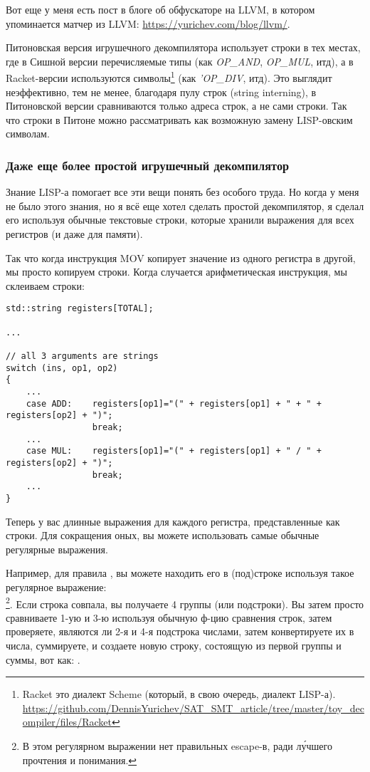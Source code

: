 Вот еще у меня есть пост в блоге об обфускаторе на LLVM, в котором упоминается матчер из LLVM:
\url{https://yurichev.com/blog/llvm/}.

Питоновская версия игрушечного декомпилятора использует строки в тех местах, где в Сишной версии перечисляемые типы
(как \textit{OP\_AND}, \textit{OP\_MUL}, итд),
а в Racket-версии используются символы\footnote{Racket это диалект Scheme (который, в свою очередь, диалект LISP-а).
\url{https://github.com/DennisYurichev/SAT_SMT_article/tree/master/toy_decompiler/files/Racket}} (как \textit{'OP\_DIV}, итд).
Это выглядит неэффективно, тем не менее, благодаря пулу строк (string interning), в Питоновской версии сравниваются
только адреса строк, а не сами строки.
Так что строки в Питоне можно рассматривать как возможную замену LISP-овским символам.

\subsubsection{Даже еще более простой игрушечный декомпилятор}

Знание LISP-а помогает все эти вещи понять без особого труда.
Но когда у меня не было этого знания, но я всё еще хотел сделать простой декомпилятор, я сделал его используя обычные
текстовые строки, которые хранили выражения для всех регистров (и даже для памяти).

Так что когда инструкция MOV копирует значение из одного регистра в другой, мы просто копируем строки.
Когда случается арифметическая инструкция, мы склеиваем строки:

\begin{lstlisting}
std::string registers[TOTAL];

...

// all 3 arguments are strings
switch (ins, op1, op2)
{
    ...
    case ADD:    registers[op1]="(" + registers[op1] + " + " + registers[op2] + ")";
                 break;
    ...
    case MUL:    registers[op1]="(" + registers[op1] + " / " + registers[op2] + ")";
                 break;
    ...
}
\end{lstlisting}

Теперь у вас длинные выражения для каждого регистра, представленные как строки.
Для сокращения оных, вы можете использовать самые обычные регулярные выражения.

Например, для правила , вы можете находить его в (под)строке используя такое регулярное
выражение: \\
\footnote{В этом регулярном выражении нет правильных escape-в, ради л\'{у}чшего прочтения и понимания.}.
Если строка совпала, вы получаете 4 группы (или подстроки).
Вы затем просто сравниваете 1-ую и 3-ю используя обычную ф-цию сравнения строк, затем проверяете,
являются ли 2-я и 4-я подстрока числами, затем конвертируете их в числа, суммируете, и создаете новую строку, состоящую
из первой группы и суммы, вот как: .

